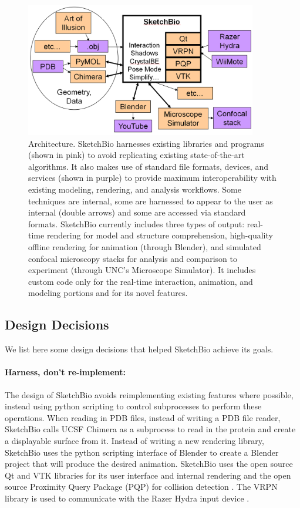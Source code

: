 \documentclass[twocolumn]{bmcart}%
\begin{document}
\begin{figure}[ht]
    \begin{center}
    \noindent\includegraphics[width=0.9\textwidth]
    {system_diagram.png}
    \end{center}
\caption{Architecture.  SketchBio harnesses existing libraries and programs (shown in pink) to avoid replicating existing state-of-the-art algorithms.  It also makes use of standard file formats, devices, and services (shown in purple) to provide maximum interoperability with existing modeling, rendering, and analysis workflows.  Some techniques are internal, some are harnessed to appear to the user as internal (double arrows) and some are accessed via standard formats.  SketchBio currently includes three types of output: real-time rendering for model and structure comprehension, high-quality offline rendering for animation (through Blender), and simulated confocal microscopy stacks for analysis and comparison to experiment (through UNC's Microscope Simulator).  It includes custom code only for the real-time interaction, animation, and modeling portions and for its novel features.}
\label{fig:architecture}
\end{figure}

\subsection*{Design Decisions}
We list here some design decisions that helped SketchBio achieve its goals.

\paragraph*{Harness, don't re-implement:} The design of SketchBio avoids reimplementing existing features where possible, instead using python scripting to control subprocesses to perform these operations.  When reading in PDB files, instead of writing a PDB file reader, SketchBio calls UCSF Chimera as a subprocess to read in the protein and create a displayable surface from it.  Instead of writing a new rendering library, SketchBio uses the python scripting interface of Blender to create a Blender project that will produce the desired animation.  SketchBio uses the open source Qt and VTK\cite{VTKbook} libraries for its user interface and internal rendering and the open source Proximity Query Package (PQP) for collision detection \cite{PQP}.  The VRPN library is used to communicate with the Razer Hydra input device \cite{taylor2001vrpn}.
\end{document}

